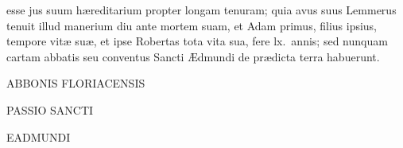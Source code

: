\documentclass[10pt]{book}
\begin{document}
esse jus suum h\ae{}reditarium propter longam tenuram; quia avus suus Lemmerus tenuit illud manerium diu ante mortem suam, et Adam primus, filius ipsius, tempore vit\ae{} su\ae{}, et ipse Robertas tota vita sua, fere lx.\ annis; sed nunquam cartam abbatis seu conventus Sancti \AE{}dmundi de pr\ae{}dicta terra habuerunt.


\cleardoublepage



\begin{center}
{\bfseries \lsstyle

\phantom{ }\vfill

{\color{BrickRed} \Large ABBONIS FLORIACENSIS}

\vspace{0.2cm}

{\Huge PASSIO SANCTI}

\vspace{0.2cm}

{\Huge EADMUNDI}

\vfill

}

\end{center}


\cleardoublepage
\end{document}
